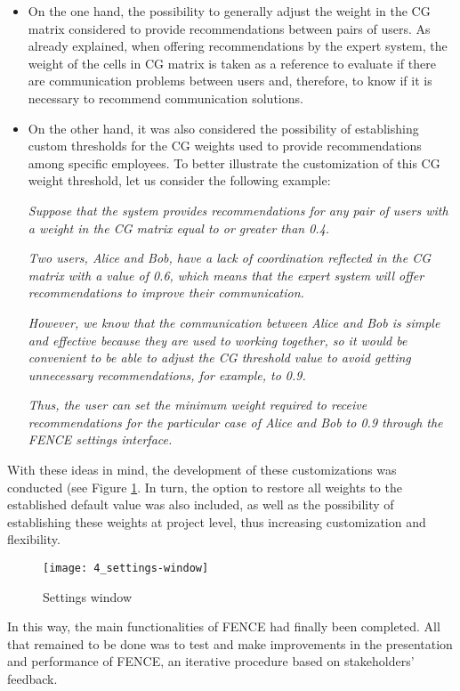 \begin{itemize}
\item On the one hand, the possibility to generally adjust the weight in the CG matrix considered to provide recommendations between pairs of users. As already explained, when offering recommendations by the expert system, the weight of the cells in CG matrix is taken as a reference to evaluate if there are communication problems between users and, therefore, to know if it is necessary to recommend communication solutions.
\item On the other hand, it was also considered the possibility of establishing custom thresholds for the CG weights used to provide recommendations among specific employees. To better illustrate the customization of this CG weight threshold, let us consider the following example:\newline


\indent\emph{Suppose that the system provides recommendations for any pair of users with a weight in the CG matrix equal to or greater than 0.4.\newline}

\indent\emph{Two users, Alice and Bob, have a lack of coordination reflected in the CG matrix with a value of 0.6, which means that the expert system will offer recommendations to improve their communication.\newline}

\indent\emph{However, we know that the communication between Alice and Bob is simple and effective because they are used to working together, so it would be convenient to be able to adjust the CG threshold value to avoid getting unnecessary recommendations, for example, to 0.9.\newline}

\indent\emph{Thus, the user can set the minimum weight required to receive recommendations for the particular case of Alice and Bob to 0.9 through the FENCE settings interface.\newline}


\end{itemize}

With these ideas in mind, the development of these customizations was conducted (see Figure \ref{fig:settings}. In turn, the option to restore all weights to the established default value was also included, as well as the possibility of establishing these weights at project level, thus increasing customization and flexibility.
\begin{figure}
	\centering
	\texttt{[image: 4\_settings-window]}
	\caption[Settings window]{Settings window}
	\label{fig:settings}
\end{figure}
In this way, the main functionalities of FENCE had finally been completed. All that remained to be done was to test and make improvements in the presentation and performance of FENCE, an iterative procedure based on stakeholders' feedback.

